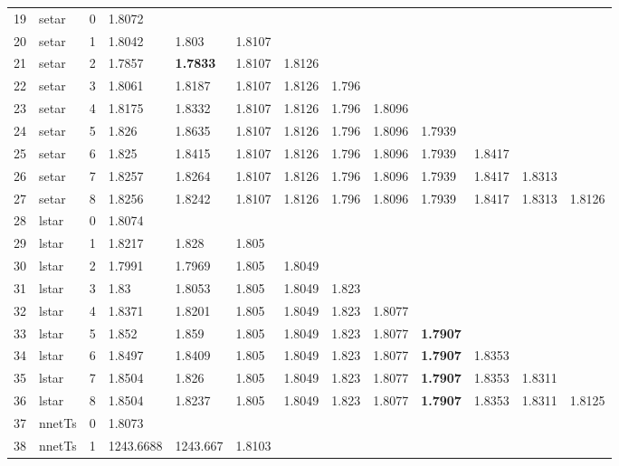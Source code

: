 \documentclass[10pt,a4paper]{article}
\begin{document}
\begin{table}[ht]
\begin{tabular}{rlrllllllllll}
   \hline
19 & setar &     0 & 1.8072 &  &  &  &  &  &  &  &  &  \\ 
  20 & setar &     1 & 1.8042 & 1.803 & 1.8107 &  &  &  &  &  &  &  \\ 
  21 & setar &     2 & 1.7857 & \textbf{1.7833} & 1.8107 & 1.8126 &  &  &  &  &  &  \\ 
  22 & setar &     3 & 1.8061 & 1.8187 & 1.8107 & 1.8126 & 1.796 &  &  &  &  &  \\ 
  23 & setar &     4 & 1.8175 & 1.8332 & 1.8107 & 1.8126 & 1.796 & 1.8096 &  &  &  &  \\ 
  24 & setar &     5 & 1.826 & 1.8635 & 1.8107 & 1.8126 & 1.796 & 1.8096 & 1.7939 &  &  &  \\ 
  25 & setar &     6 & 1.825 & 1.8415 & 1.8107 & 1.8126 & 1.796 & 1.8096 & 1.7939 & 1.8417 &  &  \\ 
  26 & setar &     7 & 1.8257 & 1.8264 & 1.8107 & 1.8126 & 1.796 & 1.8096 & 1.7939 & 1.8417 & 1.8313 &  \\ 
  27 & setar &     8 & 1.8256 & 1.8242 & 1.8107 & 1.8126 & 1.796 & 1.8096 & 1.7939 & 1.8417 & 1.8313 & 1.8126 \\ 
   \hline
28 & lstar &     0 & 1.8074 &  &  &  &  &  &  &  &  &  \\ 
  29 & lstar &     1 & 1.8217 & 1.828 & 1.805 &  &  &  &  &  &  &  \\ 
  30 & lstar &     2 & 1.7991 & 1.7969 & 1.805 & 1.8049 &  &  &  &  &  &  \\ 
  31 & lstar &     3 & 1.83 & 1.8053 & 1.805 & 1.8049 & 1.823 &  &  &  &  &  \\ 
  32 & lstar &     4 & 1.8371 & 1.8201 & 1.805 & 1.8049 & 1.823 & 1.8077 &  &  &  &  \\ 
  33 & lstar &     5 & 1.852 & 1.859 & 1.805 & 1.8049 & 1.823 & 1.8077 & \textbf{1.7907} &  &  &  \\ 
  34 & lstar &     6 & 1.8497 & 1.8409 & 1.805 & 1.8049 & 1.823 & 1.8077 & \textbf{1.7907} & 1.8353 &  &  \\ 
  35 & lstar &     7 & 1.8504 & 1.826 & 1.805 & 1.8049 & 1.823 & 1.8077 & \textbf{1.7907} & 1.8353 & 1.8311 &  \\ 
  36 & lstar &     8 & 1.8504 & 1.8237 & 1.805 & 1.8049 & 1.823 & 1.8077 & \textbf{1.7907} & 1.8353 & 1.8311 & 1.8125 \\ 
   \hline
37 & nnetTs &     0 & 1.8073 &  &  &  &  &  &  &  &  &  \\ 
  38 & nnetTs &     1 & 1243.6688 & 1243.667 & 1.8103 &  &  &  &  &  &  &  \\ 

\end{tabular}
\end{table}
\end{document}
